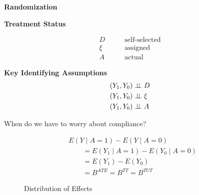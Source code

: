 \begin{frame}\begin{center}
\LARGE\textbf{Randomization}
\end{center}\end{frame}
\begin{frame}\textbf{Treatment Status}\vspace{0.3cm}

\begin{align*}
D &\qquad \text{self-selected} \\
\xi &\qquad \text{assigned} \\
A &\qquad  \text{actual}
\end{align*}
\end{frame}
\begin{frame}\textbf{Key Identifying Assumptions}\vspace{0.3cm}
\begin{align*}
(Y_1, Y_0) & \indep D \\
(Y_1, Y_0) & \indep \xi \\
(Y_1, Y_0) & \indep A
\end{align*}

When do we have to worry about compliance?

\end{frame}
\begin{frame}
\begin{align*}
& E(Y\mid A = 1) - E(Y\mid A = 0) \\
& \qquad = E(Y_1\mid A = 1) - E(Y_0\mid A = 0)  \tag{by full compliance} \\
& \qquad = E(Y_1) - E(Y_0)  \tag{by randomization} \\
& \qquad = B^{ATE} = B^{TT} = B^{TUT}
\end{align*}
\end{frame}
\begin{frame}
\begin{figure}\caption{Distribution of Effects}
\end{figure}
\end{frame}
